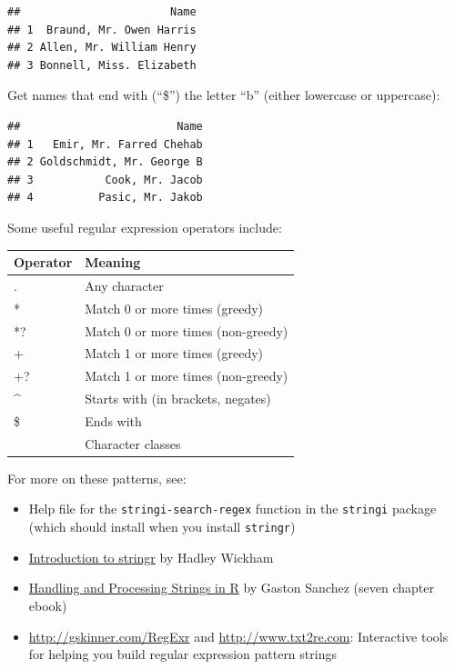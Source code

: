 \documentclass[]{book}
\makeatletter
\newenvironment{Shaded}{\begin{snugshade}}{\end{snugshade}}
\newcommand{\KeywordTok}[1]{\textcolor[rgb]{0.13,0.29,0.53}{\textbf{{#1}}}}
\newcommand{\StringTok}[1]{\textcolor[rgb]{0.31,0.60,0.02}{{#1}}}
\newcommand{\NormalTok}[1]{{#1}}
\providecommand{\tightlist}{%
  \setlength{\itemsep}{0pt}\setlength{\parskip}{0pt}}
\newenvironment{kframe}{%
\medskip{}
\setlength{\fboxsep}{.8em}
 \def\at@end@of@kframe{}%
 \ifinner\ifhmode%
  \def\at@end@of@kframe{\end{minipage}}%
  \begin{minipage}{\columnwidth}%
 \fi\fi%
 \def\FrameCommand##1{\hskip\@totalleftmargin \hskip-\fboxsep
 \colorbox{shadecolor}{##1}\hskip-\fboxsep
     \hskip-\linewidth \hskip-\@totalleftmargin \hskip\columnwidth}%
 \MakeFramed {\advance\hsize-\width
   \@totalleftmargin\z@ \linewidth\hsize
   \@setminipage}}%
 {\par\unskip\endMakeFramed%
 \at@end@of@kframe}
\renewenvironment{Shaded}{\begin{kframe}}{\end{kframe}}
\makeatother
\begin{document}
\begin{verbatim}
##                       Name
## 1  Braund, Mr. Owen Harris
## 2 Allen, Mr. William Henry
## 3 Bonnell, Miss. Elizabeth
\end{verbatim}

Get names that end with (``\$'') the letter ``b'' (either lowercase or
uppercase):

\begin{Shaded}
\end{Shaded}

\begin{verbatim}
##                        Name
## 1   Emir, Mr. Farred Chehab
## 2 Goldschmidt, Mr. George B
## 3           Cook, Mr. Jacob
## 4          Pasic, Mr. Jakob
\end{verbatim}

Some useful regular expression operators include:

\begin{tabular}{l|l}
\hline
Operator & Meaning\\
\hline
. & Any character\\
\hline
* & Match 0 or more times (greedy)\\
\hline
*? & Match 0 or more times (non-greedy)\\
\hline
+ & Match 1 or more times (greedy)\\
\hline
+? & Match 1 or more times (non-greedy)\\
\hline
\textasciicircum{} & Starts with (in brackets, negates)\\
\hline
\$ & Ends with\\
\hline
[...] & Character classes\\
\hline
\end{tabular}

For more on these patterns, see:

\begin{itemize}
\tightlist
\item
  Help file for the \texttt{stringi-search-regex} function in the
  \texttt{stringi} package (which should install when you install
  \texttt{stringr})
\item
  \href{https://cran.r-project.org/web/packages/stringr/vignettes/stringr.html}{Introduction
  to stringr} by Hadley Wickham
\item
  \href{http://gastonsanchez.com/Handling_and_Processing_Strings_in_R.pdf}{Handling
  and Processing Strings in R} by Gaston Sanchez (seven chapter ebook)
\item
  \url{http://gskinner.com/RegExr} and \url{http://www.txt2re.com}:
  Interactive tools for helping you build regular expression pattern
  strings
\end{itemize}
\end{document}
